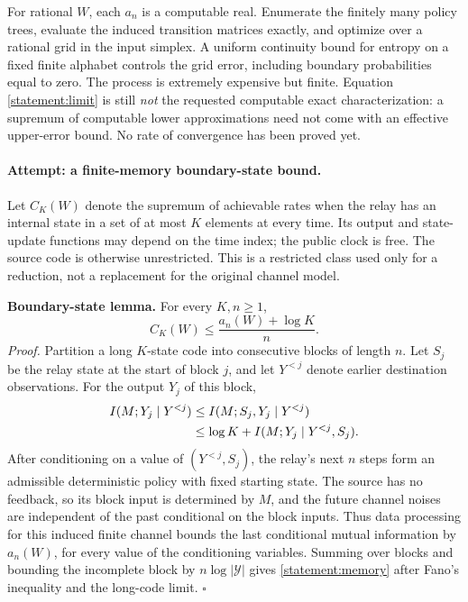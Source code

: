 \documentclass[11pt,a4paper]{article}
\numberwithin{equation}{section}
\begin{document}
For rational $W$, each $a_n$ is a computable real. Enumerate the finitely
many policy trees, evaluate the induced transition matrices exactly,
and optimize over a rational grid in the input simplex. A uniform
continuity bound for entropy on a fixed finite alphabet controls the
grid error, including boundary probabilities equal to zero. The process
is extremely expensive but finite. Equation \eqref{statement:limit} is still
\emph{not} the requested computable exact characterization: a supremum
of computable lower approximations need not come with an effective
upper-error bound. No rate of convergence has been proved yet.

\paragraph{Attempt: a finite-memory boundary-state bound.}
Let $C_K(W)$ denote the supremum of achievable rates when the relay
has an internal state in a set of at most $K$ elements at every time.
Its output and state-update functions may depend on the time index;
the public clock is free. The source code is otherwise unrestricted.
This is a restricted class used only for a reduction, not a replacement
for the original channel model.

\textbf{Boundary-state lemma.} For every $K,n\geq1$,
\begin{equation}\label{statement:memory}
 C_K(W)\leq\frac{a_n(W)+\log K}{n}.
\end{equation}
\emph{Proof.} Partition a long $K$-state code into consecutive blocks
of length $n$. Let $S_j$ be the relay state at the start of block $j$,
and let $Y^{<j}$ denote earlier destination observations. For the output
$Y_j$ of this block,
\begin{align}
 I(M;Y_j\mid Y^{<j})
 &\leq I(M;S_j,Y_j\mid Y^{<j})\notag\\
 &\leq\log K+I(M;Y_j\mid Y^{<j},S_j).
\end{align}
After conditioning on a value of $(Y^{<j},S_j)$, the relay's next $n$
steps form an admissible deterministic policy with fixed starting
state. The source has no feedback, so its block input is determined
by $M$, and the future channel noises are independent of the past
conditional on the block inputs. Thus data processing for this induced
finite channel bounds the last conditional mutual information by
$a_n(W)$, for every value of the conditioning variables. Summing over
blocks and bounding the incomplete block by $n\log|\mathcal Y|$ gives
\eqref{statement:memory} after Fano's inequality and the long-code limit.
\hfill$\square$
\end{document}
